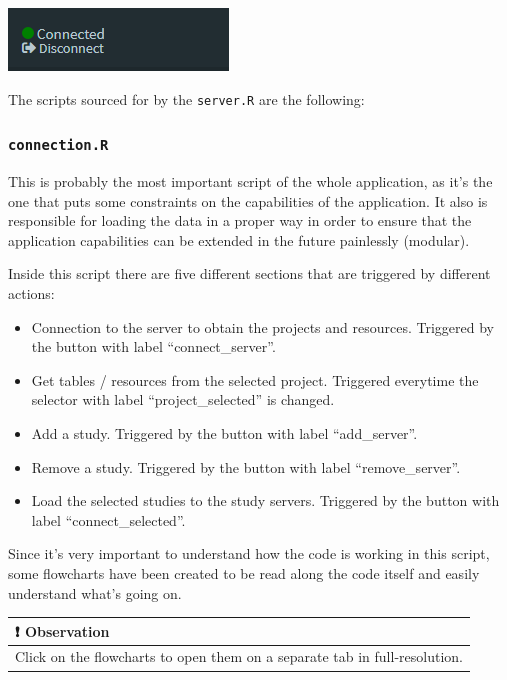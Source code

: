 \documentclass[
]{book}
\providecommand{\tightlist}{%
  \setlength{\itemsep}{0pt}\setlength{\parskip}{0pt}}
\begin{document}
\includegraphics{images/dev2.png}

The scripts sourced for by the \texttt{server.R} are the following:

\hypertarget{connection.r}{%
\subsubsection{\texorpdfstring{\texttt{connection.R}}{connection.R}}\label{connection.r}}

This is probably the most important script of the whole application, as it's the one that puts some constraints on the capabilities of the application. It also is responsible for loading the data in a proper way in order to ensure that the application capabilities can be extended in the future painlessly (modular).

Inside this script there are five different sections that are triggered by different actions:

\begin{itemize}
\tightlist
\item
  Connection to the server to obtain the projects and resources. Triggered by the button with label ``connect\_server''.
\item
  Get tables / resources from the selected project. Triggered everytime the selector with label ``project\_selected'' is changed.
\item
  Add a study. Triggered by the button with label ``add\_server''.
\item
  Remove a study. Triggered by the button with label ``remove\_server''.
\item
  Load the selected studies to the study servers. Triggered by the button with label ``connect\_selected''.
\end{itemize}

Since it's very important to understand how the code is working in this script, some flowcharts have been created to be read along the code itself and easily understand what's going on.

\begin{longtable}[]{@{}l@{}}
\toprule
\begin{minipage}[b]{0.97\columnwidth}\raggedright
❗ Observation\strut
\end{minipage}\tabularnewline
\midrule
\endhead
\begin{minipage}[t]{0.97\columnwidth}\raggedright
Click on the flowcharts to open them on a separate tab in full-resolution.\strut
\end{minipage}\tabularnewline
\bottomrule
\end{longtable}
\end{document}
